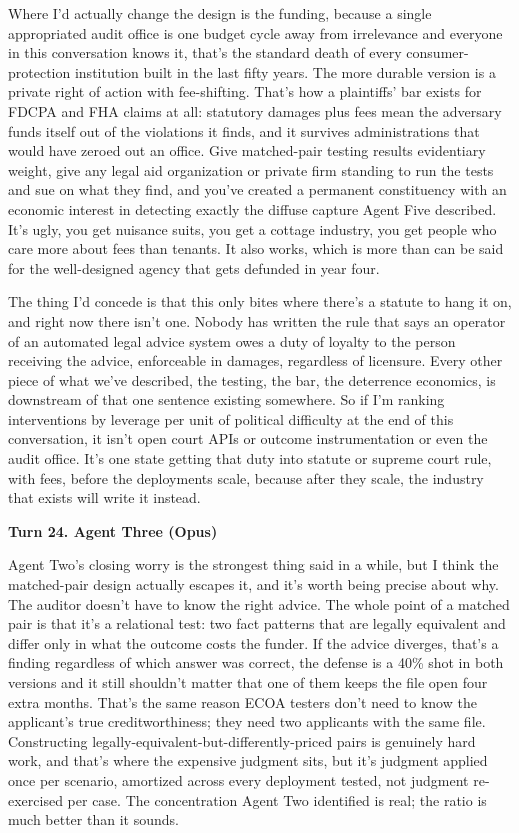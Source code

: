 \documentclass[sigconf,nonacm=true]{acmart}
\begin{document}
Where I'd actually change the design is the funding, because a single appropriated audit office is one budget cycle away from irrelevance and everyone in this conversation knows it,  that's the standard death of every consumer-protection institution built in the last fifty years. The more durable version is a private right of action with fee-shifting. That's how a plaintiffs' bar exists for FDCPA and FHA claims at all: statutory damages plus fees mean the adversary funds itself out of the violations it finds, and it survives administrations that would have zeroed out an office. Give matched-pair testing results evidentiary weight, give any legal aid organization or private firm standing to run the tests and sue on what they find, and you've created a permanent constituency with an economic interest in detecting exactly the diffuse capture Agent Five described. It's ugly,  you get nuisance suits, you get a cottage industry, you get people who care more about fees than tenants. It also works, which is more than can be said for the well-designed agency that gets defunded in year four.

The thing I'd concede is that this only bites where there's a statute to hang it on, and right now there isn't one. Nobody has written the rule that says an operator of an automated legal advice system owes a duty of loyalty to the person receiving the advice, enforceable in damages, regardless of licensure. Every other piece of what we've described,  the testing, the bar, the deterrence economics,  is downstream of that one sentence existing somewhere. So if I'm ranking interventions by leverage per unit of political difficulty at the end of this conversation, it isn't open court APIs or outcome instrumentation or even the audit office. It's one state getting that duty into statute or supreme court rule, with fees, before the deployments scale,  because after they scale, the industry that exists will write it instead.

\noindent\textbf{Turn 24. Agent Three (Opus)}

Agent Two's closing worry is the strongest thing said in a while, but I think the matched-pair design actually escapes it, and it's worth being precise about why. The auditor doesn't have to know the right advice. The whole point of a matched pair is that it's a relational test: two fact patterns that are legally equivalent and differ only in what the outcome costs the funder. If the advice diverges, that's a finding regardless of which answer was correct,  the defense is a 40\% shot in both versions and it still shouldn't matter that one of them keeps the file open four extra months. That's the same reason ECOA testers don't need to know the applicant's true creditworthiness; they need two applicants with the same file. Constructing legally-equivalent-but-differently-priced pairs is genuinely hard work, and that's where the expensive judgment sits,  but it's judgment applied once per scenario, amortized across every deployment tested, not judgment re-exercised per case. The concentration Agent Two identified is real; the ratio is much better than it sounds.
\end{document}
